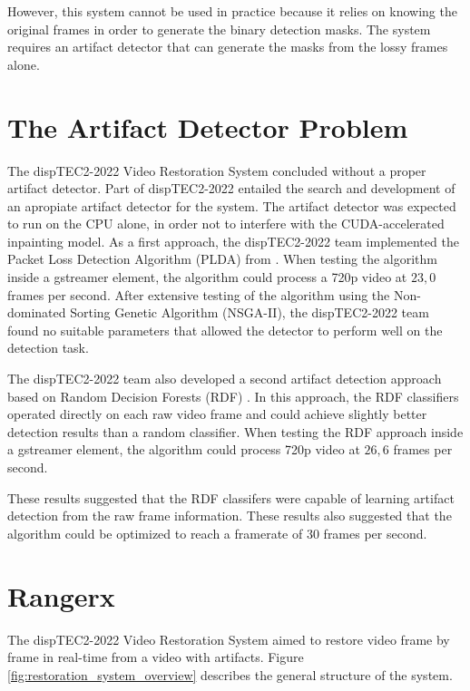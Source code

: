 However, this system cannot be used in practice because it relies on knowing the original frames in order to generate the binary detection masks. The system requires an artifact detector that can generate the masks from the lossy frames alone.

\section{The Artifact Detector Problem}
\label{sec:intro_problem}

The dispTEC2-2022 Video Restoration System concluded without a proper artifact detector. Part of dispTEC2-2022 entailed the search and development of an apropiate artifact detector for the system. The artifact detector was expected to run on the CPU alone, in order not to interfere with the CUDA-accelerated inpainting model. As a first approach, the dispTEC2-2022 team implemented the Packet Loss Detection Algorithm (PLDA) from \cite{Vranjes2018}. When testing the algorithm inside a gstreamer element, the algorithm could process a 720p video at $23,0$ frames per second.  After extensive testing of the algorithm using the Non-dominated Sorting Genetic Algorithm (NSGA-II), the dispTEC2-2022 team found no suitable parameters that allowed the detector to perform well on the detection task.

The dispTEC2-2022 team also developed a second artifact detection approach based on Random Decision Forests (RDF) \cite{Breiman2001}. In this approach, the RDF classifiers operated directly on each raw video frame and could achieve slightly better detection results than a random classifier. When testing the RDF approach inside a gstreamer element, the algorithm could process 720p video at $26,6$ frames per second.

These results suggested that the RDF classifers were capable of learning artifact detection from the raw frame information. These results also suggested that the algorithm could be optimized to reach a framerate of $30$ frames per second.


\section{Rangerx}
\label{sec:intro_detector}

The dispTEC2-2022 Video Restoration System aimed to restore video frame by frame in real-time from a video with artifacts. Figure \ref{fig:restoration_system_overview} describes the general structure of the system.


